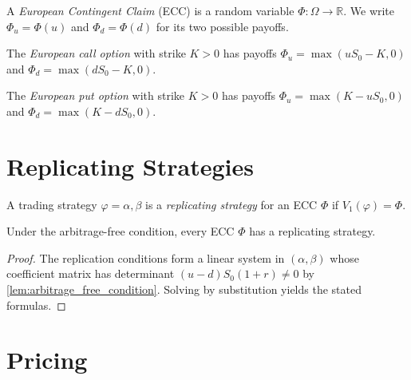 \begin{definition}\label{def:ecc}
  \leanok
  A \emph{European Contingent Claim} (ECC) is a random variable
  $\Phi : \Omega \to \mathbb{R}$. We write $\Phi_u = \Phi(u)$ and
  $\Phi_d = \Phi(d)$ for its two possible payoffs.
\end{definition}

\begin{example}\label{ex:european_call}
  The \emph{European call option} with strike $K > 0$ has payoffs
  $\Phi_u = \max(uS_0 - K, 0)$ and $\Phi_d = \max(dS_0 - K, 0)$.
\end{example}

\begin{example}\label{ex:european_put}
  The \emph{European put option} with strike $K > 0$ has payoffs
  $\Phi_u = \max(K - uS_0, 0)$ and $\Phi_d = \max(K - dS_0, 0)$.
\end{example}

\section{Replicating Strategies}

\begin{definition}\label{def:replicating_strategy}
    \leanok
    A trading strategy $\varphi = {\alpha, \beta}$ is a \emph{replicating strategy} for an ECC $\Phi$ if $V_1(\varphi) = \Phi$.
\end{definition}

\begin{theorem}\label{thm:replication_existence}
    Under the arbitrage-free condition, every ECC $\Phi$ has a replicating strategy.
\end{theorem}

\begin{proof}
  The replication conditions form a linear system in $(\alpha, \beta)$
  whose coefficient matrix has determinant $(u - d)S_0 (1 + r) \neq 0$ by
  \ref{lem:arbitrage_free_condition}. Solving by substitution yields the
  stated formulas.
\end{proof}

\section{Pricing}

